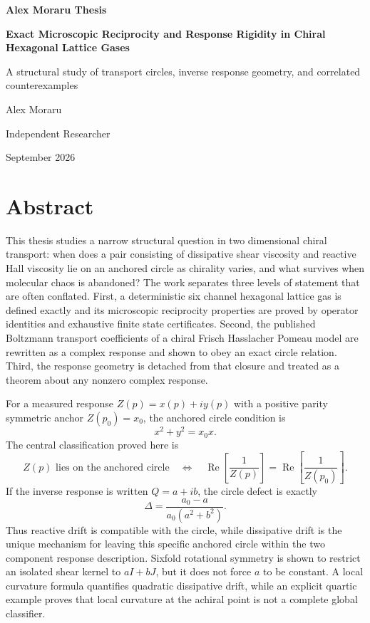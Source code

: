 \documentclass[11pt,a4paper,twoside]{report}
\newcommand{\RePart}{\operatorname{Re}}
\begin{document}
\begin{titlepage}
\centering
\vspace*{25mm}
{\Large\bfseries Alex Moraru Thesis\par}
\vspace{14mm}
{\huge\bfseries Exact Microscopic Reciprocity and Response Rigidity in Chiral Hexagonal Lattice Gases\par}
\vspace{12mm}
{\Large A structural study of transport circles, inverse response geometry, and correlated counterexamples\par}
\vfill
{\large Alex Moraru\par}
{\large Independent Researcher\par}
\vspace{8mm}
{\large September 2026\par}
\end{titlepage}

\setcounter{page}{1}
\chapter*{Abstract}
This thesis studies a narrow structural question in two dimensional chiral transport: when does a pair consisting of dissipative shear viscosity and reactive Hall viscosity lie on an anchored circle as chirality varies, and what survives when molecular chaos is abandoned? The work separates three levels of statement that are often conflated. First, a deterministic six channel hexagonal lattice gas is defined exactly and its microscopic reciprocity properties are proved by operator identities and exhaustive finite state certificates. Second, the published Boltzmann transport coefficients of a chiral Frisch Hasslacher Pomeau model are rewritten as a complex response and shown to obey an exact circle relation. Third, the response geometry is detached from that closure and treated as a theorem about any nonzero complex response.

For a measured response $Z(p)=x(p)+i y(p)$ with a positive parity symmetric anchor $Z(p_0)=x_0$, the anchored circle condition is
\[
 x^2+y^2=x_0x.
\]
The central classification proved here is
\[
 Z(p)\text{ lies on the anchored circle}
 \quad\Longleftrightarrow\quad
 \RePart\!\left[\frac{1}{Z(p)}\right]
 =\RePart\!\left[\frac{1}{Z(p_0)}\right].
\]
If the inverse response is written $Q=a+i b$, the circle defect is exactly
\[
 \Delta=\frac{a_0-a}{a_0(a^2+b^2)}.
\]
Thus reactive drift is compatible with the circle, while dissipative drift is the unique mechanism for leaving this specific anchored circle within the two component response description. Sixfold rotational symmetry is shown to restrict an isolated shear kernel to $aI+bJ$, but it does not force $a$ to be constant. A local curvature formula quantifies quadratic dissipative drift, while an explicit quartic example proves that local curvature at the achiral point is not a complete global classifier.
\end{document}
